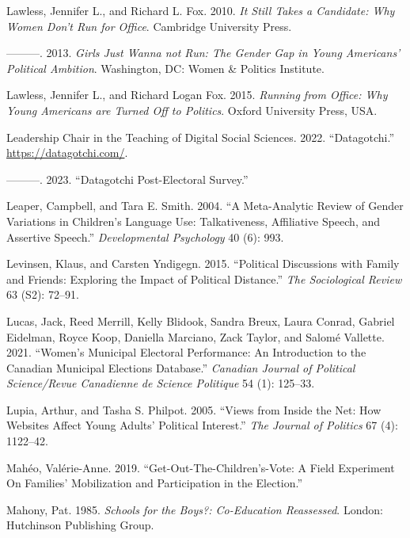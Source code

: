 \documentclass[
  letterpaper,
  DIV=11,
  numbers=noendperiod]{scrreprt}
\newlength{\cslhangindent}
\newenvironment{CSLReferences}[2] %
 {\begin{list}{}{%
  \setlength{\itemindent}{0pt}
  \setlength{\leftmargin}{0pt}
  \setlength{\parsep}{0pt}
  \ifodd #1
   \setlength{\leftmargin}{\cslhangindent}
   \setlength{\itemindent}{-1\cslhangindent}
  \fi
  \setlength{\itemsep}{#2\baselineskip}}}
 {\end{list}}
\begin{document}
\begin{CSLReferences}{1}{0}
Lawless, Jennifer L., and Richard L. Fox. 2010. \emph{{It Still Takes a
Candidate: Why Women Don't Run for Office}}. Cambridge University Press.

---------. 2013. \emph{{Girls Just Wanna not Run: The Gender Gap in
Young Americans' Political Ambition}}. Washington, DC: Women \& Politics
Institute.

Lawless, Jennifer L., and Richard Logan Fox. 2015. \emph{{Running from
Office: Why Young Americans are Turned Off to Politics}}. Oxford
University Press, USA.

Leadership Chair in the Teaching of Digital Social Sciences. 2022.
{``{Datagotchi}.''} \url{https://datagotchi.com/}.

---------. 2023. {``{Datagotchi Post-Electoral Survey}.''}

Leaper, Campbell, and Tara E. Smith. 2004. {``{A Meta-Analytic Review of
Gender Variations in Children's Language Use: Talkativeness, Affiliative
Speech, and Assertive Speech}.''} \emph{Developmental Psychology} 40
(6): 993.

Levinsen, Klaus, and Carsten Yndigegn. 2015. {``{Political Discussions
with Family and Friends: Exploring the Impact of Political Distance}.''}
\emph{The Sociological Review} 63 (S2): 72--91.

Lucas, Jack, Reed Merrill, Kelly Blidook, Sandra Breux, Laura Conrad,
Gabriel Eidelman, Royce Koop, Daniella Marciano, Zack Taylor, and Salomé
Vallette. 2021. {``{Women's Municipal Electoral Performance: An
Introduction to the Canadian Municipal Elections Database}.''}
\emph{Canadian Journal of Political Science/Revue Canadienne de Science
Politique} 54 (1): 125--33.

Lupia, Arthur, and Tasha S. Philpot. 2005. {``{Views from Inside the
Net: How Websites Affect Young Adults' Political Interest}.''} \emph{The
Journal of Politics} 67 (4): 1122--42.

Mahéo, Valérie-Anne. 2019. {``{Get-Out-The-Children's-Vote: A Field
Experiment On Families' Mobilization and Participation in the
Election}.''}

Mahony, Pat. 1985. \emph{{Schools for the Boys?: Co-Education
Reassessed}}. London: Hutchinson Publishing Group.


\end{CSLReferences}
\end{document}

